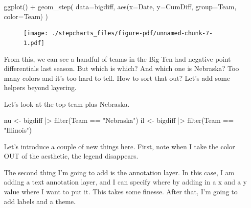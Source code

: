 \documentclass[
  letterpaper,
  DIV=11,
  numbers=noendperiod]{scrreprt}
\newenvironment{Shaded}{\begin{snugshade}}{\end{snugshade}}
\newcommand{\AttributeTok}[1]{\textcolor[rgb]{0.40,0.45,0.13}{#1}}
\newcommand{\FunctionTok}[1]{\textcolor[rgb]{0.28,0.35,0.67}{#1}}
\newcommand{\NormalTok}[1]{\textcolor[rgb]{0.00,0.23,0.31}{#1}}
\newcommand{\OtherTok}[1]{\textcolor[rgb]{0.00,0.23,0.31}{#1}}
\newcommand{\SpecialCharTok}[1]{\textcolor[rgb]{0.37,0.37,0.37}{#1}}
\newcommand{\StringTok}[1]{\textcolor[rgb]{0.13,0.47,0.30}{#1}}
\begin{document}
\begin{Shaded}
\begin{Highlighting}[]
\FunctionTok{ggplot}\NormalTok{() }\SpecialCharTok{+} 
  \FunctionTok{geom\_step}\NormalTok{(}
    \AttributeTok{data=}\NormalTok{bigdiff, }
    \FunctionTok{aes}\NormalTok{(}\AttributeTok{x=}\NormalTok{Date, }\AttributeTok{y=}\NormalTok{CumDiff, }\AttributeTok{group=}\NormalTok{Team, }\AttributeTok{color=}\NormalTok{Team)}
\NormalTok{    )}
\end{Highlighting}
\end{Shaded}

\begin{figure}[H]

{\centering \texttt{[image: ./stepcharts\_files/figure-pdf/unnamed-chunk-7-1.pdf]}

}

\end{figure}

From this, we can see a handful of teams in the Big Ten had negative
point differentials last season. But which is which? And which one is
Nebraska? Too many colors and it's too hard to tell. How to sort that
out? Let's add some helpers beyond layering.

Let's look at the top team plus Nebraska.

\begin{Shaded}
\begin{Highlighting}[]
\NormalTok{nu }\OtherTok{\textless{}{-}}\NormalTok{ bigdiff }\SpecialCharTok{|\textgreater{}} \FunctionTok{filter}\NormalTok{(Team }\SpecialCharTok{==} \StringTok{"Nebraska"}\NormalTok{)}
\NormalTok{il }\OtherTok{\textless{}{-}}\NormalTok{ bigdiff }\SpecialCharTok{|\textgreater{}} \FunctionTok{filter}\NormalTok{(Team }\SpecialCharTok{==} \StringTok{"Illinois"}\NormalTok{)}
\end{Highlighting}
\end{Shaded}

Let's introduce a couple of new things here. First, note when I take the
color OUT of the aesthetic, the legend disappears.

The second thing I'm going to add is the annotation layer. In this case,
I am adding a text annotation layer, and I can specify where by adding
in a x and a y value where I want to put it. This takes some finesse.
After that, I'm going to add labels and a theme.
\end{document}

